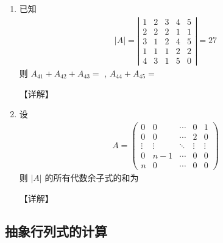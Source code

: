 \documentclass[12pt, a4paper, oneside, UTF8]{ctexbook}
\begin{document}
\begin{enumerate}[label=\arabic*.,start=4]
    \item 已知 
    \begin{align*}
    |A|=\left|\begin{array}{lllll}
    1 & 2 & 3 & 4 & 5 \\
    2 & 2 & 2 & 1 & 1 \\
    3 & 1 & 2 & 4 & 5 \\
    1 & 1 & 1 & 2 & 2 \\
    4 & 3 & 1 & 5 & 0
    \end{array}\right|=27
    \end{align*}
    则 $A_{41}+A_{42}+A_{43}=$ \underline{\hspace{3cm}}, $A_{44}+A_{45}=$ \underline{\hspace{3cm}}
    
    \begin{solution}
    【详解】
    \end{solution}
    
    \item 设 
    \begin{align*}
    A=\begin{pmatrix}
    0 & 0 & \cdots & 0 & 1 \\
    0 & 0 & \cdots & 2 & 0 \\
    \vdots & \vdots & \ddots & \vdots & \vdots \\
    0 & n-1 & \cdots & 0 & 0 \\
    n & 0 & \cdots & 0 & 0
    \end{pmatrix}
    \end{align*}
    则 $|A|$ 的所有代数余子式的和为\underline{\hspace{3cm}}
    
    \begin{solution}
    【详解】
    \end{solution}
\end{enumerate}

\subsection{抽象行列式的计算}
\end{document}
